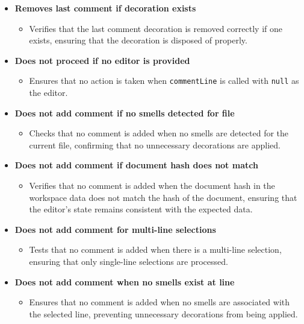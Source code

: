 \documentclass[12pt, titlepage]{article}
\begin{document}
  \begin{itemize}
    \item \textbf{Removes last comment if decoration exists}
      \begin{itemize}
        \item Verifies that the last comment decoration is removed
          correctly if one exists, ensuring that the decoration is
          disposed of properly.
      \end{itemize}

    \item \textbf{Does not proceed if no editor is provided}
      \begin{itemize}
        \item Ensures that no action is taken when
          \texttt{commentLine} is called with \texttt{null} as the editor.
      \end{itemize}

    \item \textbf{Does not add comment if no smells detected for file}
      \begin{itemize}
        \item Checks that no comment is added when no smells are
          detected for the current file, confirming that no
          unnecessary decorations are applied.
      \end{itemize}

    \item \textbf{Does not add comment if document hash does not match}
      \begin{itemize}
        \item Verifies that no comment is added when the document
          hash in the workspace data does not match the hash of the
          document, ensuring that the editor's state remains
          consistent with the expected data.
      \end{itemize}

    \item \textbf{Does not add comment for multi-line selections}
      \begin{itemize}
        \item Tests that no comment is added when there is a
          multi-line selection, ensuring that only single-line
          selections are processed.
      \end{itemize}

    \item \textbf{Does not add comment when no smells exist at line}
      \begin{itemize}
        \item Ensures that no comment is added when no smells are
          associated with the selected line, preventing unnecessary
          decorations from being applied.
      \end{itemize}


\end{itemize}
\end{document}
